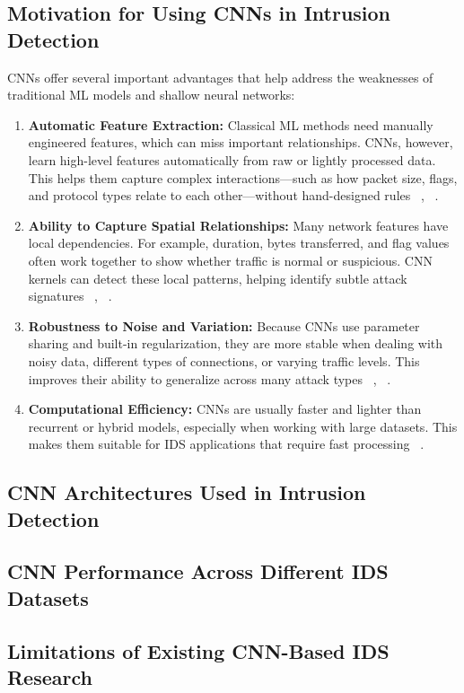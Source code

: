 \lipsum[1]

\subsection{Motivation for Using CNNs in Intrusion Detection} 
CNNs offer several important advantages that help address the weaknesses of traditional ML models and shallow neural networks:
\begin{enumerate}
\item \textbf{Automatic Feature Extraction: }
Classical ML methods need manually engineered features, which can miss important relationships. CNNs, however, learn high-level features automatically from raw or lightly processed data. This helps them capture complex interactions—such as how packet size, flags, and protocol types relate to each other—without hand-designed rules ~\cite{wu2018novel}, ~\cite{naseer2018enhanced}.
\item \textbf{Ability to Capture Spatial Relationships: }
Many network features have local dependencies. For example, duration, bytes transferred, and flag values often work together to show whether traffic is normal or suspicious. CNN kernels can detect these local patterns, helping identify subtle attack signatures ~\cite{li2017intrusion}, ~\cite{tang2016deep}.
\item \textbf{Robustness to Noise and Variation: }
Because CNNs use parameter sharing and built-in regularization, they are more stable when dealing with noisy data, different types of connections, or varying traffic levels. This improves their ability to generalize across many attack types ~\cite{al2021convolutional}, ~\cite{kim2020cnn}.
\item \textbf{Computational Efficiency: }
CNNs are usually faster and lighter than recurrent or hybrid models, especially when working with large datasets. This makes them suitable for IDS applications that require fast processing ~\cite{khan2021hcrnnids}.
\end{enumerate}

\subsection{CNN Architectures Used in Intrusion Detection}
\lipsum[2]

\subsection{CNN Performance Across Different IDS Datasets}
\lipsum[2]

\subsection{Limitations of Existing CNN-Based IDS Research}
\lipsum[2]
